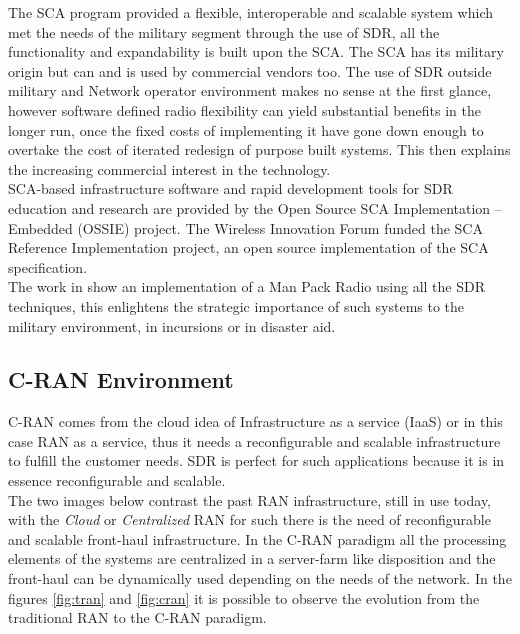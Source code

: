 The SCA program provided a flexible, interoperable and scalable system which met
the needs of the military segment through the use of SDR, all the functionality
and expandability is built upon the SCA. The SCA has its military origin but can
and is used by commercial vendors too. The use of SDR outside military and
Network operator environment makes no sense at the first glance, however
software defined radio flexibility can yield substantial benefits in
the longer run, once the fixed costs of implementing it have gone down enough to
overtake the cost of iterated redesign of purpose built systems. This then
explains the increasing commercial interest in the technology.\\

SCA-based infrastructure software and rapid development tools for SDR education
and research are provided by the Open Source SCA Implementation – Embedded
(OSSIE) project. The Wireless Innovation Forum funded the SCA Reference
Implementation project, an open source implementation of the SCA specification.\\

The work in \cite{Chamberlain2005} show an implementation of a Man Pack Radio
using all the SDR techniques, this enlightens the strategic importance of such
systems to the military environment, in incursions or in disaster aid.

\subsection{C-RAN Environment}

C-RAN comes from the cloud idea of Infrastructure as a service (IaaS) or in this
case RAN as a service, thus it needs a reconfigurable and scalable
infrastructure to fulfill the customer needs. SDR is perfect for such
applications because  it is in essence reconfigurable and scalable.\\

The two images below contrast the past RAN infrastructure, still in use today,
with the \emph{Cloud} or \emph{Centralized} RAN for such there is the need of
reconfigurable and scalable front-haul infrastructure. In the C-RAN paradigm all
the processing elements of the systems are centralized in a server-farm like
disposition and the front-haul can be dynamically used depending on the needs of
the network. In the figures \ref{fig:tran} and \ref{fig:cran} it is possible to
observe the evolution from the traditional RAN to the C-RAN paradigm.

